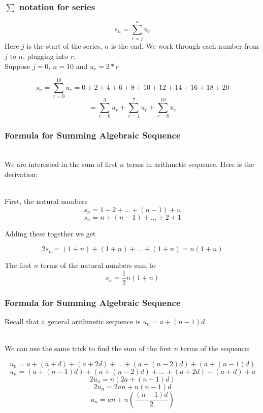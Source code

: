 \documentclass[handout]{beamer}
\numberwithin{equation}{section}
\begin{document}
\begin{frame}
\frametitle{$\sum$ notation for series}

$$s_n=\sum_{r=j}^{n}u_r$$
Here $j$ is the start of the series, $n$ is the end.  We work through each number from $j$ to $n$, plugging into $r$.\pause
\vspace{5mm} \\ 
Suppose $j=0$, $n=10$ and $u_r = 2* r$ 

$$s_n=\sum_{r=0}^{10}u_r=0+2+4+6+8+10+12+14+16+18+20$$
$$=\sum_{r=0}^{3}u_r+\sum_{r=4}^{7}u_r+\sum_{r=8}^{10}u_r$$

\end{frame}

\begin{frame}
\frametitle{Formula for Summing Algebraic Sequence}

\ \\We are interested in the sum of first $n$ terms in arithmetic sequence. Here is the derivation: \pause

\ \\First, the natural numbers $$s_n=1+ 2+ ...+(n-1)+  n$$
 $$s_n=n + (n-1) + ...+ 2+ 1$$ \pause
 
 Adding these together we get 
 
 $$2s_n=(1+n)+(1+n)+...+(1+n)= n(1+n)$$ \pause
 
 The first $n$ terms of the natural numbers sum to 
 $$s_n={\frac{1}{2}}n(1+n)$$

\end{frame}



\begin{frame}
\frametitle{Formula for Summing Algebraic Sequence}

Recall that a general arithmetic sequence is $u_n=a+(n-1)d$ \pause

\ \\We can use the same trick to find the sum of the first $n$ terms of the sequence:

$$u_n=a+(a+d)+(a+2d)+...+(a+(n-2)d)+(a+(n-1)d)$$\pause
$$u_n=(a+(n-1)d)+(a+(n-2)d)+...+(a+2d)+(a+d)+a$$\pause
$$2u_n=n\left(2a+(n-1)d\right)$$\pause
$$2u_n=2an+n(n-1)d$$\pause
$$u_n=an+n\left({\frac{(n-1)d}{2}}\right)$$

\end{frame}
\end{document}
